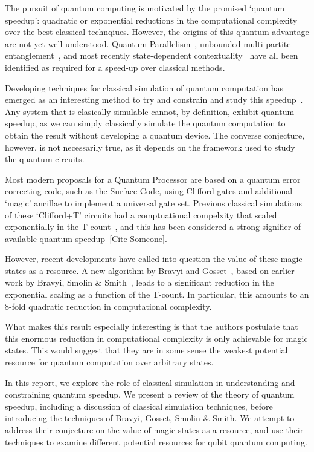 \documentclass{standalone}
\begin{document}
The pursuit of quantum computing is motivated by the promised `quantum speedup': quadratic or exponential reductions in the computational complexity over the best classical technqiues. However, the origins of this quantum advantage are not yet well understood. Quantum Parallelism~\cite{Deutsch1985}, unbounded multi-partite entanglement~\cite{Jozsa2003}, and most recently state-dependent contextuality~\cite{Howard2014} have all been identified as required for a speed-up over classical methods. 
\par
Developing techniques for classical simulation of quantum computation has emerged as an interesting method to try and constrain and study this speedup~\cite{Jozsa2003}. Any system that is clasically simulable cannot, by definition, exhibit quantum speedup, as we can simply classically simulate the quantum computation to obtain the result without developing a quantum device. The converse conjecture, however, is not necessarily true, as it depends on the framework used to study the quantum circuits.  
\par
Most modern proposals for a Quantum Processor are based on a quantum error correcting code, such as the Surface Code, using Clifford gates and additional `magic' ancillae to implement a universal gate set. Previous classical simulations of these `Clifford+T' circuits had a comptuational compelxity that scaled exponentially in the T-count~\cite{Aaronson2004a}, and this has been considered a strong signifier of available quantum speedup~[Cite Someone].
\par
However, recent developments have called into question the value of these magic states as a resource. A new algorithm by Bravyi and Gosset~\cite{Bravyi2016b}, based on earlier work by Bravyi, Smolin \& Smith~\cite{Bravyi2015}, leads to a significant reduction in the exponential scaling as a function of the T-count. In particular, this amounts to an 8-fold quadratic reduction in computational complexity. 
\par 
What makes this result especially interesting is that the authors postulate that this enormous reduction in computational complexity is only achievable for magic states.  This would suggest that they are in some sense the weakest potential resource for quantum computation over arbitrary states.

In this report, we explore the role of classical simulation in understanding and constraining quantum speedup. We present a review of the theory of quantum speedup, including a discussion of classical simulation techniques, before introducing the techniques of Bravyi, Gosset, Smolin \& Smith. We attempt to address their conjecture on the value of magic states as a resource, and use their techniques to examine different potential resources for qubit quantum computing. 
\ifstandalone

\fi
\end{document}
